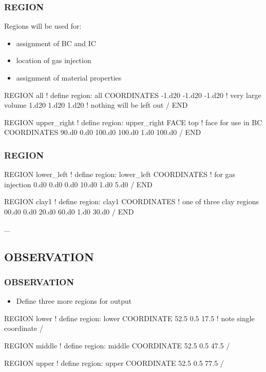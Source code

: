 \documentclass{beamer}
\newcommand\redcomment[1]{{{\color{red} #1}}}
\newcommand\bluecomment[1]{{{\color{blue} #1}}}
\newcommand\greencomment[1]{{{\color{green} #1}}}
\begin{document}
\begin{frame}[fragile]\frametitle{REGION}
Regions will be used for:
\begin{itemize}
  \item{assignment of \redcomment{BC} and \redcomment{IC}}
  \item{location of \redcomment{gas injection}}
  \item{assignment of \redcomment{material properties}}
\end{itemize}

\begin{semiverbatim}\small
REGION all               \bluecomment{! define region:} \greencomment{all}
  COORDINATES
    -1.d20 -1.d20 -1.d20 \bluecomment{! very large volume}
     1.d20  1.d20  1.d20 \bluecomment{! nothing will be left out}
  /
END

REGION upper_right       \bluecomment{! define region:} \greencomment{upper_right}
  FACE top               \bluecomment{! face for use in BC}
  COORDINATES
    90.d0 0.d0 100.d0
    100.d0 1.d0 100.d0
  /
END
\end{semiverbatim}
\end{frame}

\begin{frame}[fragile]\frametitle{REGION}

\begin{semiverbatim}\small
REGION lower_left        \bluecomment{! define region:} \greencomment{lower_left}
  COORDINATES            \bluecomment{! for gas injection}
    0.d0 0.d0 0.d0
    10.d0 1.d0 5.d0
  /
END

REGION clay1             \bluecomment{! define region:} \greencomment{clay1}
  COORDINATES            \bluecomment{! one of three clay regions}
    00.d0 0.d0 20.d0
    60.d0 1.d0 30.d0
  /
END

...

\end{semiverbatim}
  
\end{frame}
\subsection{OBSERVATION}

\begin{frame}[fragile]\frametitle{OBSERVATION}
\begin{itemize}
  \item{Define three more regions for \redcomment{output}}
\end{itemize}

\begin{semiverbatim}\small
REGION lower \bluecomment{! define region:} \greencomment{lower}
  COORDINATE 52.5 0.5 17.5 \bluecomment{! note single coordinate}
/

REGION middle \bluecomment{! define region:} \greencomment{middle}
  COORDINATE 52.5 0.5 47.5
/

REGION upper \bluecomment{! define region:} \greencomment{upper}
  COORDINATE 52.5 0.5 77.5
/
\end{semiverbatim}
\end{frame}
\end{document}
